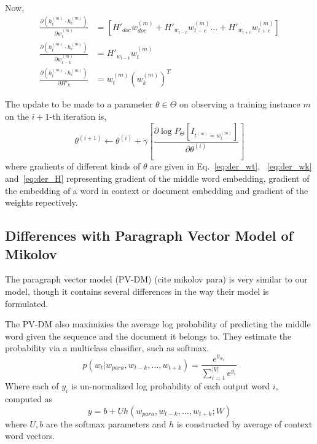 \documentclass{article}
\begin{document}
Now,
\begin{align}
\label{eq:der_wt}
\frac{\partial (h^{(m)}_{t}\cdot h^{(m)}_{c})}{\partial w^{(m)}_{t}} &= \left[ H'_{doc}w^{(m)}_{doc} + H'_{w_{t-c}}w^{(m)}_{t-c} \ldots +  H'_{w_{t+c}}w^{(m)}_{t+c} \right] \\
\label{eq:der_wk}
\frac{\partial (h^{(m)}_{t}\cdot h^{(m)}_{c})}{\partial w^{(m)}_{t-k}} &= H'_{w_{t-k}}w^{(m)}_{t} \\
\label{eq:der_H}
\frac{\partial (h^{(m)}_{t}\cdot h^{(m)}_{c})}{\partial H'_{k}} &= w^{(m)}_{t} (w^{(m)}_{k})^{T}
\end{align}

The update to be made to a parameter $\theta \in \Theta$ on observing a training instance $m$ on the $i+1$-th iteration is,
\begin{equation}
\label{eq:update}
\theta^{(i+1)} \leftarrow \theta^{(i)} + \gamma \left[\frac{\partial \log P_{\Theta}\left[I_{t^{(m)}=w^{(m)}_{t}} \right]}{\partial \theta^{(i)}} \right]
\end{equation} 
where gradients of different kinds of $\theta$ are given in Eq.~\ref{eq:der_wt}, ~\ref{eq:der_wk} and~\ref{eq:der_H} representing gradient of the middle word embedding, gradient of the embedding of a word in context or document embedding and gradient of the weights repectively.

\subsection{Differences with Paragraph Vector Model of Mikolov}
The paragraph vector model (PV-DM) (cite mikolov para) is very similar to our model, though it contains several differences in the way their model is formulated. 

The PV-DM also maximizies the average log probability of predicting the middle word given the sequence and the document it belongs to. They estimate the probability via a multiclass classifier, such as softmax.
\begin{equation}
p(w_{t} | w_{para}, w_{t-k}, \ldots, w_{t+k}) = \frac{e^{y_{w_{t}}}}{\sum_{i=1}^{|V|} e^{y_{i}}}
\end{equation}
Where each of $y_{i}$ is un-normalized log probability of each output word $i$, computed as 
\begin{equation}
y = b + Uh(w_{para}, w_{t-k}, \ldots, w_{t+k}; W)
\end{equation}
where $U,b$ are the softmax parameters and $h$ is constructed by average of context word vectors.
\end{document}

